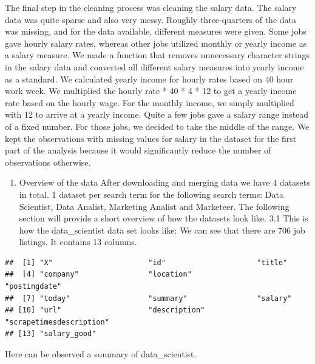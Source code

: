 \documentclass[
]{article}
\providecommand{\tightlist}{%
  \setlength{\itemsep}{0pt}\setlength{\parskip}{0pt}}
\begin{document}
The final step in the cleaning process was cleaning the salary data. The
salary data was quite sparse and also very messy. Roughly three-quarters
of the data was missing, and for the data available, different measures
were given. Some jobs gave hourly salary rates, whereas other jobs
utilized monthly or yearly income as a salary measure. We made a
function that removes unnecessary character strings in the salary data
and converted all different salary measures into yearly income as a
standard. We calculated yearly income for hourly rates based on 40 hour
work week. We multiplied the hourly rate * 40 * 4 * 12 to get a yearly
income rate based on the hourly wage. For the monthly income, we simply
multiplied with 12 to arrive at a yearly income. Quite a few jobs gave a
salary range instead of a fixed number. For those jobs, we decided to
take the middle of the range. We kept the observations with missing
values for salary in the dataset for the first part of the analysis
because it would significantly reduce the number of observations
otherwise.

\begin{enumerate}
\def\labelenumi{\arabic{enumi}.}
\setcounter{enumi}{2}
\tightlist
\item
  Overview of the data After downloading and merging data we have 4
  datasets in total. 1 dataset per search term for the following search
  terms: Data Scientist, Data Analist, Marketing Analist and Marketeer.
  The following section will provide a short overview of how the
  datasets look like. 3.1 This is how the data\_scientist data set looks
  like: We can see that there are 706 job listings. It contains 13
  columns.
\end{enumerate}

\begin{verbatim}
##  [1] "X"                      "id"                     "title"                 
##  [4] "company"                "location"               "postingdate"           
##  [7] "today"                  "summary"                "salary"                
## [10] "url"                    "description"            "scrapetimesdescription"
## [13] "salary_good"
\end{verbatim}

Here can be observed a summary of data\_scientist.
\end{document}
